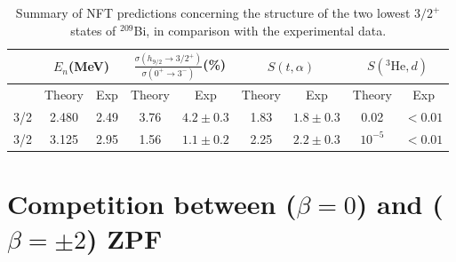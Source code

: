 \begin{table}
	\begin{tabular}{|c|c|c|c|c|c|c|c|c|}
		\hline
		& \multicolumn{2}{|c}{$E_n$(MeV)} & \multicolumn{2}{|c}{$\frac{\sigma(h_{9/2}\rightarrow 3/2^+)}{\sigma(0^+\rightarrow 3^-)}$(\%)} & \multicolumn{2}{|c}{$S(t,\alpha)$}  & \multicolumn{2}{|c|}{$S(^3\text{He},d)$}   \\
		\hline
		&Theory  & Exp  & Theory  & Exp & Theory & Exp & Theory  & Exp  \\
		\hline
		3/2& 2.480 & 2.49  & 3.76  & $4.2\pm0.3$  & 1.83  & $1.8\pm0.3$ &0.02  & $<0.01$  \\
		3/2& 3.125 & 2.95  & 1.56 & $1.1\pm0.2$  & 2.25  & $2.2\pm0.3$ & $10^{-5}$  & $<0.01$  \\
		\hline
	\end{tabular}\caption{Summary of NFT predictions concerning the structure of the two lowest $3/2^+$ states of $^{209}$Bi, in comparison with the experimental data.}\label{tabintroC3}
\end{table}







\section[Competition between ZPF]{Competition between ($\beta=0$) and  ($\beta=\pm2$) ZPF}\label{appintroF}

